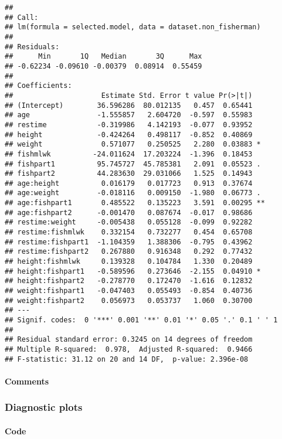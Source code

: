 \documentclass[12pt,]{article}
\let\oldparagraph\paragraph
\renewcommand{\paragraph}[1]{\oldparagraph{#1}\mbox{}}
\begin{document}
\begin{verbatim}
## 
## Call:
## lm(formula = selected.model, data = dataset.non_fisherman)
## 
## Residuals:
##      Min       1Q   Median       3Q      Max 
## -0.62234 -0.09610 -0.00379  0.08914  0.55459 
## 
## Coefficients:
##                     Estimate Std. Error t value Pr(>|t|)   
## (Intercept)        36.596286  80.012135   0.457  0.65441   
## age                -1.555857   2.604720  -0.597  0.55983   
## restime            -0.319986   4.142193  -0.077  0.93952   
## height             -0.424264   0.498117  -0.852  0.40869   
## weight              0.571077   0.250525   2.280  0.03883 * 
## fishmlwk          -24.011624  17.203224  -1.396  0.18453   
## fishpart1          95.745727  45.785381   2.091  0.05523 . 
## fishpart2          44.283630  29.031066   1.525  0.14943   
## age:height          0.016179   0.017723   0.913  0.37674   
## age:weight         -0.018116   0.009150  -1.980  0.06773 . 
## age:fishpart1       0.485522   0.135223   3.591  0.00295 **
## age:fishpart2      -0.001470   0.087674  -0.017  0.98686   
## restime:weight     -0.005438   0.055128  -0.099  0.92282   
## restime:fishmlwk    0.332154   0.732277   0.454  0.65708   
## restime:fishpart1  -1.104359   1.388306  -0.795  0.43962   
## restime:fishpart2   0.267880   0.916348   0.292  0.77432   
## height:fishmlwk     0.139328   0.104784   1.330  0.20489   
## height:fishpart1   -0.589596   0.273646  -2.155  0.04910 * 
## height:fishpart2   -0.278770   0.172470  -1.616  0.12832   
## weight:fishpart1   -0.047403   0.055493  -0.854  0.40736   
## weight:fishpart2    0.056973   0.053737   1.060  0.30700   
## ---
## Signif. codes:  0 '***' 0.001 '**' 0.01 '*' 0.05 '.' 0.1 ' ' 1
## 
## Residual standard error: 0.3245 on 14 degrees of freedom
## Multiple R-squared:  0.978,  Adjusted R-squared:  0.9466 
## F-statistic: 31.12 on 20 and 14 DF,  p-value: 2.396e-08
\end{verbatim}

\paragraph{Comments}\label{comments-4}

\subsubsection{Diagnostic plots}\label{diagnostic-plots}

\paragraph{Code}\label{code-6}
\end{document}

